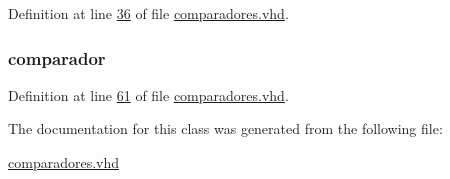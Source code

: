 Definition at line \hyperlink{comparadores_8vhd_source_l00036}{36} of file \hyperlink{comparadores_8vhd_source}{comparadores.\+vhd}.

\hypertarget{classcomparadores_1_1comparadores_a6277e2a7446059985dc9bcf0a4ac1a8f}{}
\subsubsection[{u}]{ {\bfseries \textcolor{vhdlchar}{comparador}\textcolor{vhdlchar}{ }} \hspace{0.3cm}{\ttfamily [Instantiation]}}\label{classcomparadores_1_1comparadores_a6277e2a7446059985dc9bcf0a4ac1a8f}


Definition at line \hyperlink{comparadores_8vhd_source_l00061}{61} of file \hyperlink{comparadores_8vhd_source}{comparadores.\+vhd}.



The documentation for this class was generated from the following file\+:\begin{DoxyCompactItemize}
\item 
\hyperlink{comparadores_8vhd}{comparadores.\+vhd}\end{DoxyCompactItemize}
